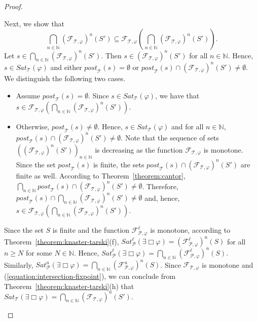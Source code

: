 \documentclass[12pt]{article}
\newcommand{\always}{\Box}
\theoremstyle{definition}
\begin{document}
\begin{proof}
\begin{itemize}
Next, we show that
\begin{equation}
\label{equation:intersection-fixpoint}
\bigcap_{n \in \mathbb{N}} (\mathcal{F}_{\mathcal{T}, \varphi})^n(S') \subseteq \mathcal{F}_{\mathcal{T}, \varphi}(\bigcap_{n \in \mathbb{N}} (\mathcal{F}_{\mathcal{T}, \varphi})^n(S')).
\end{equation}
Let $s \in \bigcap_{n \in \mathbb{N}} (\mathcal{F}_{\mathcal{T}, \varphi})^n(S')$.  Then $s \in (\mathcal{F}_{\mathcal{T}, \varphi})^n(S')$ for all $n \in \mathbb{N}$.  Hence, $s \in \mathit{Sat}_{\mathcal{T}}(\varphi)$ and either $\mathit{post}_{\mathcal{T}}(s) = \emptyset$ or $\mathit{post}_{\mathcal{T}}(s) \cap (\mathcal{F}_{\mathcal{T}, \varphi})^n(S') \not= \emptyset$.  We distinguish the following two cases.
\begin{itemize}
\item 
Assume $\mathit{post}_{\mathcal{T}}(s) = \emptyset$.  Since $s \in \mathit{Sat}_{\mathcal{T}}(\varphi)$, we have that $s \in \mathcal{F}_{\mathcal{T}, \varphi}(\bigcap_{n \in \mathbb{N}} (\mathcal{F}_{\mathcal{T}, \varphi})^n(S'))$.
\item
Otherwise, $\mathit{post}_{\mathcal{T}}(s) \not= \emptyset$.  Hence, $s \in \mathit{Sat}_{\mathcal{T}}(\varphi)$ and for all $n \in \mathbb{N}$, $\mathit{post}_{\mathcal{T}}(s) \cap (\mathcal{F}_{\mathcal{T}, \varphi})^n(S') \not= \emptyset$.  Note that the sequence of sets $((\mathcal{F}_{\mathcal{T}, \varphi})^n(S'))_{n \in \mathbb{N}}$ is decreasing as the function $\mathcal{F}_{\mathcal{T}, \varphi}$ is monotone.  Since the set $\mathit{post}_{\mathcal{T}}(s)$ is finite, the sets $\mathit{post}_{\mathcal{T}}(s) \cap (\mathcal{F}_{\mathcal{T}, \varphi})^n(S')$ are finite as well.  According to Theorem~\ref{theorem:cantor}, $\bigcap_{n \in \mathbb{N}} \mathit{post}_{\mathcal{T}}(s) \cap (\mathcal{F}_{\mathcal{T}, \varphi})^n(S') \not= \emptyset$.  Therefore, $\mathit{post}_{\mathcal{T}}(s) \cap \bigcap_{n \in \mathbb{N}} (\mathcal{F}_{\mathcal{T}, \varphi})^n(S') \not= \emptyset$ and, hence, $s \in \mathcal{F}_{\mathcal{T}, \varphi}(\bigcap_{n \in \mathbb{N}} (\mathcal{F}_{\mathcal{T}, \varphi})^n(S'))$.
\end{itemize}

Since the set $S$ is finite and the function $\mathcal{F}_{\mathcal{P}, \varphi}^{\ell}$ is monotone, according to Theorem~\ref{theorem:knaster-tarski}(f), $\mathit{Sat}^{\ell}_{\mathcal{P}}(\exists \always \varphi) = (\mathcal{F}_{\mathcal{P}, \varphi}^{\ell})^n(S)$ for all $n \geq N$ for some $N \in \mathbb{N}$.  Hence, $\mathit{Sat}^{\ell}_{\mathcal{P}}(\exists \always \varphi) = \bigcap_{n \in \mathbb{N}} (\mathcal{F}_{\mathcal{P}, \varphi}^{\ell})^n(S)$.  Similarly, $\mathit{Sat}^{u}_{\mathcal{P}}(\exists \always \varphi) = \bigcap_{n \in \mathbb{N}} (\mathcal{F}_{\mathcal{P}, \varphi}^{u})^n(S)$.  Since $\mathcal{F}_{\mathcal{T}, \varphi}$ is monotone and (\ref{equation:intersection-fixpoint}), we can conclude from Theorem~\ref{theorem:knaster-tarski}(h) that $\mathit{Sat}_{\mathcal{T}}(\exists \always \varphi) = \bigcap_{n \in \mathbb{N}} (\mathcal{F}_{\mathcal{T}, \varphi})^n(S')$.


\end{itemize}
\end{proof}
\end{document}

